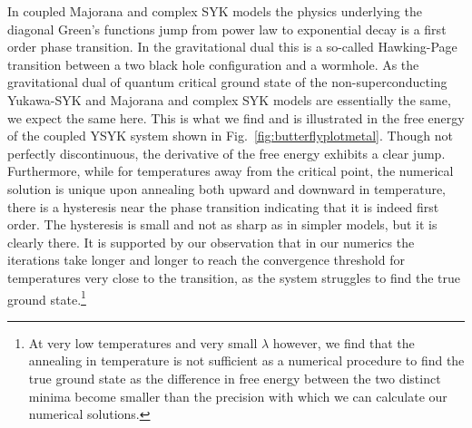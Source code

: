 In  coupled Majorana \cite{maldacena2018eternal,pluggeRevivalDynamicsTraversable2020a} and complex SYK models \cite{sahoo_traversable_2020} the physics underlying the diagonal Green's functions jump from power law to exponential decay is a first order phase transition. In the gravitational dual this is a so-called Hawking-Page transition between a two black hole configuration and a wormhole.
%
As the gravitational dual of quantum critical ground state of the non-superconducting Yukawa-SYK and Majorana and complex SYK models are essentially the same, we expect the same here. This is what we find and is illustrated in the free energy of the coupled YSYK system shown in  Fig.~\ref{fig:butterflyplotmetal}. 
Though not perfectly discontinuous, the derivative of the free energy exhibits a clear jump. Furthermore, while for temperatures away from the critical point, the numerical solution is unique upon annealing both upward and downward in temperature, there is a hysteresis near the phase transition indicating that it is indeed first order. The hysteresis is small and not as sharp as in simpler models, but it is clearly there. 
It is supported by our observation that in our numerics
the iterations take longer and longer to reach the convergence threshold for temperatures very close to the transition, as the system struggles to find the true ground state.\footnote{At very low temperatures and very small $\lambda$ however, we find that the annealing in temperature is not sufficient as a numerical procedure to find the true ground state as the difference in free energy between the two distinct minima become smaller than the precision with which we can calculate our numerical solutions. 
}

